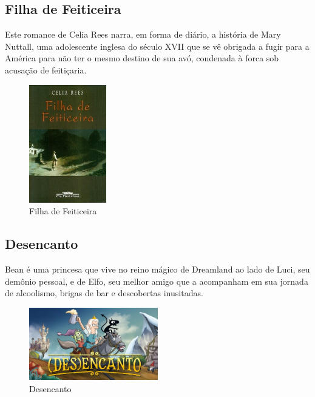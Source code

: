 \clearpage

\subsection{Filha de Feiticeira}

Este romance de Celia Rees narra, em forma de diário, a história de Mary
Nuttall, uma adolescente inglesa do século XVII que se vê obrigada a fugir para
a América para não ter o mesmo destino de sua avó, condenada à forca sob
acusação de feitiçaria.

\begin{figure}[!htb] \caption{\label{filha_feiticeira}Filha de Feiticeira}
    \begin{center}
    \includegraphics[width=0.3\textwidth]{imagens/feiticeira.jpeg} \end{center}
 \end{figure}



\subsection{Desencanto}

Bean é uma princesa que vive no reino mágico de Dreamland ao lado de Luci, seu
demônio pessoal, e de Elfo, seu melhor amigo que a acompanham em sua jornada de
alcoolismo, brigas de bar e descobertas inusitadas.



\begin{figure}[!htb] \caption{\label{Desencanto}Desencanto} \begin{center}
\includegraphics[width=0.5\textwidth]{imagens/Desencanto.jpg} \end{center}
 \end{figure}

